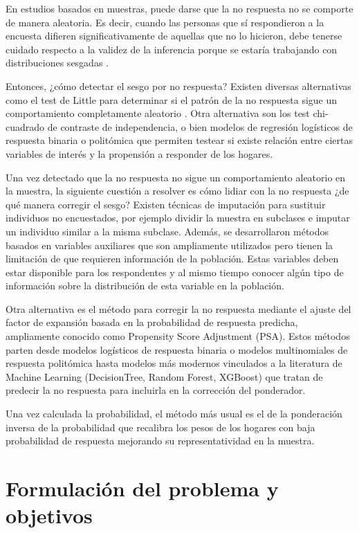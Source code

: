 \documentclass{article}
\begin{document}
En estudios basados en muestras, puede darse que la no respuesta no se comporte de manera aleatoria. Es decir, cuando las personas que sí respondieron a la encuesta difieren significativamente de aquellas que no lo hicieron, debe tenerse cuidado respecto a la validez de la inferencia porque se estaría trabajando con distribuciones sesgadas \cite{wmethods}.

Entonces, ¿cómo detectar el sesgo por no respuesta? Existen diversas alternativas como el test de Little para determinar si el patrón de la no respuesta sigue un comportamiento completamente aleatorio \cite{tesisgonz}. Otra alternativa son los test chi-cuadrado de contraste de independencia, o bien modelos de regresión logísticos de respuesta binaria o politómica que permiten testear si existe relación entre ciertas variables de interés y la propensión a responder de los hogares.

Una vez detectado que la no respuesta no sigue un comportamiento aleatorio en la muestra, la siguiente cuestión a resolver es cómo lidiar con la no respuesta ¿de qué manera corregir el sesgo? Existen técnicas de imputación para sustituir individuos no encuestados, por ejemplo dividir la muestra en subclases e imputar un individuo similar a la misma subclase. Además, se desarrollaron métodos basados en variables auxiliares que son ampliamente utilizados pero tienen la limitación de que requieren información de la población. Estas variables deben estar disponible para los respondentes y al mismo tiempo conocer algún tipo de información sobre la distribución de esta variable en la población. \cite{handbook}

Otra alternativa es el método para corregir la no respuesta mediante el ajuste del factor de expansión basada en la probabilidad de respuesta predicha, ampliamente conocido como Propensity Score Adjustment (PSA). Estos métodos parten desde modelos logísticos de respuesta binaria o modelos multinomiales de respuesta politómica  hasta modelos más modernos vinculados a la literatura de Machine Learning (DecisionTree, Random Forest, XGBoost) que tratan de predecir la no respuesta para incluirla en la corrección del ponderador. \cite{methodsml} \cite{handbook} 

Una vez calculada la probabilidad, el método más usual es el de la ponderación inversa de la probabilidad que recalibra los pesos de los hogares con baja probabilidad de respuesta mejorando su representatividad en la muestra. \cite{methodsml}


\section{Formulación del problema y objetivos}
\end{document}
